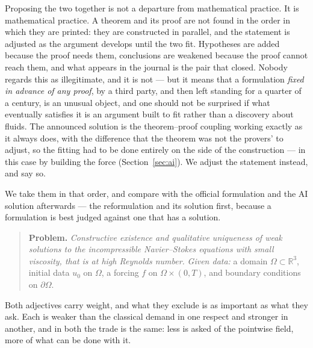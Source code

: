 \documentclass[11pt]{article}
\begin{document}
Proposing the two together is not a departure from mathematical practice. It is mathematical practice.
A theorem and its proof are not found in the order in which they are printed: they are constructed in
parallel, and the statement is adjusted as the argument develops until the two fit. Hypotheses are
added because the proof needs them, conclusions are weakened because the proof cannot reach them, and
what appears in the journal is the pair that closed. Nobody regards this as illegitimate, and it is not
--- but it means that a formulation \emph{fixed in advance of any proof}, by a third party, and then
left standing for a quarter of a century, is an unusual object, and one should not be surprised if what
eventually satisfies it is an argument built to fit rather than a discovery about fluids. The announced
solution is the theorem--proof coupling working exactly as it always does, with the difference that the
theorem was not the provers' to adjust, so the fitting had to be done entirely on the side of the
construction --- in this case by building the force (Section~\ref{sec:ai}). We adjust the statement
instead, and say so.

We take them in that order, and compare with the official formulation and the AI solution afterwards
--- the reformulation and its solution first, because a formulation is best judged against one that
has a solution.


\begin{quote}
\textbf{Problem.} \emph{Constructive existence and qualitative uniqueness of weak solutions to the
incompressible Navier--Stokes equations with small viscosity, that is at high Reynolds number.}
\emph{Given data:} a domain $\Omega\subset\mathbb{R}^3$, initial data $u_0$ on $\Omega$, a forcing
$f$ on $\Omega\times(0,T)$, and boundary conditions on $\partial\Omega$.
\end{quote}

Both adjectives carry weight, and what they exclude is as important as what they ask. Each is weaker
than the classical demand in one respect and stronger in another, and in both the trade is the same:
less is asked of the pointwise field, more of what can be done with it.
\end{document}
